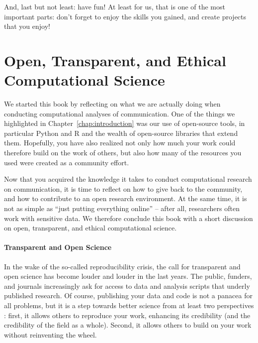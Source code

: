 And, last but not least: have fun! At least for us, that is one of the most important parts: don't forget to enjoy the skills you gained, and create projects that you enjoy!



%




\section{Open, Transparent, and Ethical Computational Science}
\label{sec:ethics}


We started this book by reflecting on what we are actually doing when conducting computational analyses of communication.
One of the things we highlighted in Chapter~\ref{chap:introduction} was our use of open-source tools, in particular Python and R
and the wealth of open-source libraries that extend them. Hopefully, you have also realized not only how much your work could
therefore build on the work of others, but also how many of the resources you used were created as a community effort.

Now that you acquired the knowledge it takes to conduct computational research on communication, it is time to reflect
on how to give back to the community, and how to contribute to an open research environment. At the same time, it is
not as simple as ``just putting everything online'' -- after all, researchers often work with sensitive data. We therefore
conclude this book with a short discussion on open, transparent, and ethical computational science.


\paragraph{Transparent and Open Science}
In the wake of the so-called reproducibility crisis, the call for transparent and open science has become louder and louder
in the last years. The public, funders, and journals increasingly ask for access to data and analysis scripts that underly
published research. Of course, publishing your data and code is not a panacea for all problems, but it is a step towards
better science from at least two perspectives \citep{VanAtteveldt2019}: first, it allows others to reproduce your work, enhancing its credibility
(and the credibility of the field as a whole). Second, it allows others to build on your work without reinventing the wheel.

